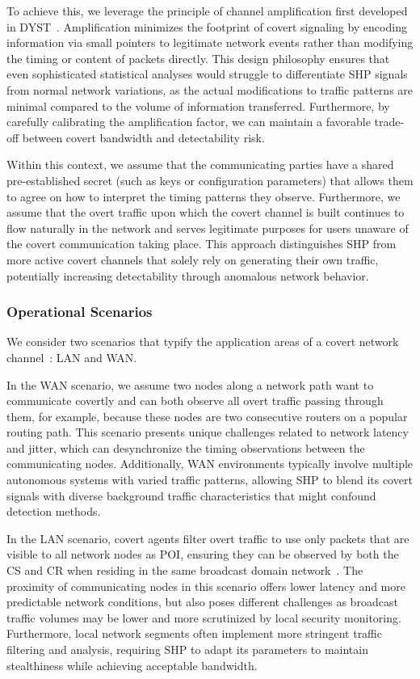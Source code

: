 \documentclass[journal]{IEEEtran}
\begin{document}
To achieve this, we leverage the principle of channel amplification first developed in \ac{DYST}~\cite{DYST22}. Amplification minimizes the footprint of covert signaling by encoding information via small pointers to legitimate network events rather than modifying the timing or content of packets directly. This design philosophy ensures that even sophisticated statistical analyses would struggle to differentiate \ac{SHP} signals from normal network variations, as the actual modifications to traffic patterns are minimal compared to the volume of information transferred. Furthermore, by carefully calibrating the amplification factor, we can maintain a favorable trade-off between covert bandwidth and detectability risk.

Within this context, we assume that the communicating parties have a shared pre-established secret (such as keys or configuration parameters) that allows them to agree on how to interpret the timing patterns they observe. Furthermore, we assume that the overt traffic upon which the covert channel is built continues to flow naturally in the network and serves legitimate purposes for users unaware of the covert communication taking place. This approach distinguishes \ac{SHP} from more active covert channels that solely rely on generating their own traffic, potentially increasing detectability through anomalous network behavior.

\subsubsection{Operational Scenarios}
We consider two scenarios that typify the application areas of a covert network channel~\cite{Schneider2023Network,Heinz2020Covert}: LAN and WAN.

In the WAN scenario, we assume two nodes along a network path want to communicate covertly and can both observe all overt traffic passing through them, for example, because these nodes are two consecutive routers on a popular routing path. This scenario presents unique challenges related to network latency and jitter, which can desynchronize the timing observations between the communicating nodes. Additionally, WAN environments typically involve multiple autonomous systems with varied traffic patterns, allowing \ac{SHP} to blend its covert signals with diverse background traffic characteristics that might confound detection methods.

In the LAN scenario, covert agents filter overt traffic to use only packets that are visible to all network nodes as \ac{POI}, ensuring they can be observed by both the \ac{CS} and \ac{CR} when residing in the same broadcast domain network~\cite{Schmid23,dua2021covert}. The proximity of communicating nodes in this scenario offers lower latency and more predictable network conditions, but also poses different challenges as broadcast traffic volumes may be lower and more scrutinized by local security monitoring. Furthermore, local network segments often implement more stringent traffic filtering and analysis, requiring \ac{SHP} to adapt its parameters to maintain stealthiness while achieving acceptable bandwidth.
\end{document}
